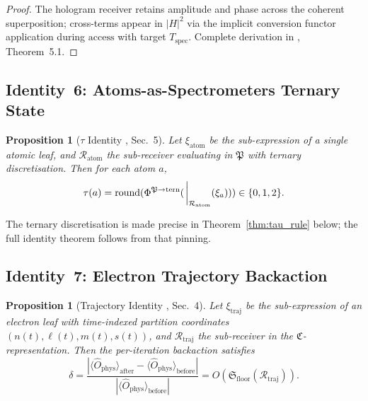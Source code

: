 \documentclass[11pt,twocolumn,a4paper]{article}
\newtheorem{proposition}[theorem]{Proposition}
\theoremstyle{definition}
\theoremstyle{remark}
\newcommand{\Recv}{\mathcal{R}}
\newcommand{\Floor}{{\mathfrak{S}_{\mathrm{floor}}}}
\newcommand{\Cat}{\mathfrak{C}}
\newcommand{\Part}{\mathfrak{P}}
\newcommand{\Sexp}{\xi}
\begin{document}
\begin{proof}
The hologram receiver retains amplitude and phase across the coherent superposition; cross-terms appear in $|H|^2$ via the implicit conversion functor application during $\mathrm{access}$ with target $T_{\mathrm{spec}}$. Complete derivation in \citep{sachikonye2025_holo}, Theorem~5.1.
\end{proof}

\subsection{Identity~6: Atoms-as-Spectrometers Ternary State}

\begin{proposition}[$\tau$ Identity \citep{sachikonye2025_atoms}, Sec.~5]
\label{prop:id_atoms}
Let $\Sexp_{\mathrm{atom}}$ be the sub-expression of a single atomic leaf, and $\Recv_{\mathrm{atom}}$ the sub-receiver evaluating in $\Part$ with ternary discretisation. Then for each atom $a$,
\begin{equation}
\tau(a) = \mathrm{round}(\Phi^{\Part \to \mathrm{tern}}(\eval_{\Recv_{\mathrm{atom}}}(\Sexp_a))) \in \{0, 1, 2\}.
\end{equation}
\end{proposition}

The ternary discretisation is made precise in Theorem~\ref{thm:tau_rule} below; the full identity theorem follows from that pinning.

\subsection{Identity~7: Electron Trajectory Backaction}

\begin{proposition}[Trajectory Identity \citep{sachikonye2025_azurin}, Sec.~4]
\label{prop:id_traj}
Let $\Sexp_{\mathrm{traj}}$ be the sub-expression of an electron leaf with time-indexed partition coordinates $(n(t), \ell(t), m(t), s(t))$, and $\Recv_{\mathrm{traj}}$ the sub-receiver in the $\Cat$-representation. Then the per-iteration backaction satisfies
\begin{equation}
\delta = \frac{|\langle \hat{O}_{\mathrm{phys}} \rangle_{\mathrm{after}} - \langle \hat{O}_{\mathrm{phys}} \rangle_{\mathrm{before}}|}{|\langle \hat{O}_{\mathrm{phys}} \rangle_{\mathrm{before}}|} = O(\Floor(\Recv_{\mathrm{traj}})).
\end{equation}
\end{proposition}
\end{document}
